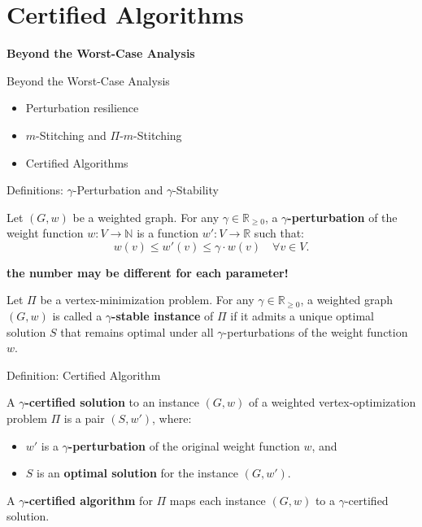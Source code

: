 \documentclass{beamer}
\begin{document}
\section{Certified Algorithms}

\begin{frame}
  \centering
  \vfill
  \LARGE \textbf{Beyond the Worst-Case Analysis}
  \vfill
\end{frame}

\begin{frame}{Beyond the Worst-Case Analysis}
  \begin{itemize}
    \item Perturbation resilience
    \item $m$-Stitching and $\Pi$-$m$-Stitching
    \item Certified Algorithms
  \end{itemize}
\end{frame}

\begin{frame}{Definitions: $\gamma$-Perturbation and $\gamma$-Stability}
  \begin{definition}
  Let $(G, w)$ be a weighted graph. For any $\gamma \in \mathbb{R}_{\geq 0}$, a \textbf{$\gamma$-perturbation} of the weight function 
  $w : V \to \mathbb{N}$ is a function $w' : V \to \mathbb{R}$ such that:
  \[
  w(v) \leq w'(v) \leq \gamma \cdot w(v) \quad \forall v \in V.
  \]
  \end{definition}
  \textbf{the number may be different for each parameter!}
  \vspace{0.5em}
  \begin{definition}
  Let $\Pi$ be a vertex-minimization problem. For any $\gamma \in \mathbb{R}_{\geq 0}$, a weighted graph $(G, w)$ is called a 
  \textbf{$\gamma$-stable instance} of $\Pi$ if it admits a unique optimal solution $S$ that remains optimal under all 
  $\gamma$-perturbations of the weight function $w$.
  \end{definition}
\end{frame}

\begin{frame}{Definition: Certified Algorithm}
\begin{definition}
A \textbf{$\gamma$-certified solution} to an instance $(G, w)$ of a weighted vertex-optimization problem $\Pi$ is a pair $(S, w')$,  
where:
\begin{itemize}
    \item $w'$ is a \textbf{$\gamma$-perturbation} of the original weight function $w$, and
    \item $S$ is an \textbf{optimal solution} for the instance $(G, w')$.
\end{itemize}

\vspace{0.5em}
A \textbf{$\gamma$-certified algorithm} for $\Pi$ maps each instance $(G, w)$ to a $\gamma$-certified solution.
\end{definition}
\end{frame}
\end{document}
